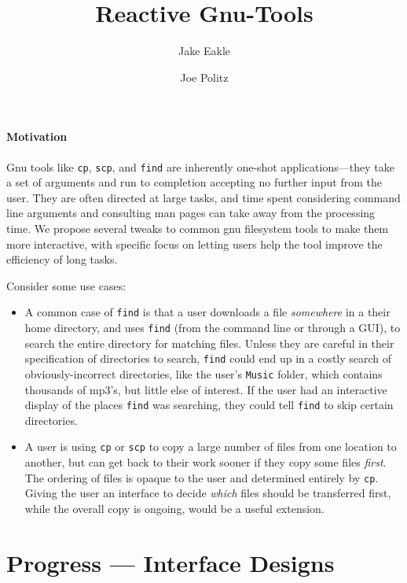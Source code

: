 \documentclass{article}
\title{Reactive Gnu-Tools}
\author{Jake Eakle \and Joe Politz}
\begin{document}
\maketitle

\paragraph{Motivation}

Gnu tools like {\tt cp}, {\tt scp}, and {\tt find} are inherently
one-shot applications---they take a set of arguments and run to
completion accepting no further input from the user.  They are often
directed at large tasks, and time spent considering command line
arguments and consulting man pages can take away from the processing
time.  We propose several tweaks to common gnu filesystem tools to
make them more interactive, with specific focus on letting users help
the tool improve the efficiency of long tasks.

Consider some use cases:

\begin{itemize}
\item A common case of {\tt find} is that a user downloads a file
  \emph{somewhere} in a their home directory, and uses {\tt find}
  (from the command line or through a GUI), to search the entire
  directory for matching files.  Unless they are careful in their
  specification of directories to search, {\tt find} could end up in a
  costly search of obviously-incorrect directories, like the user's
  {\tt Music} folder, which contains thousands of mp3's, but little
  else of interest.  If the user had an interactive display of the
  places {\tt find} was searching, they could tell {\tt find} to skip
  certain directories.

\item A user is using {\tt cp} or {\tt scp} to copy a large number of
  files from one location to another, but can get back to their work
  sooner if they copy some files \emph{first}.  The ordering of files
  is opaque to the user and determined entirely by {\tt cp}.  Giving
  the user an interface to decide \emph{which} files should be
  transferred first, while the overall copy is ongoing, would be a
  useful extension.
\end{itemize}

\section{Progress --- Interface Designs}
\end{document}
